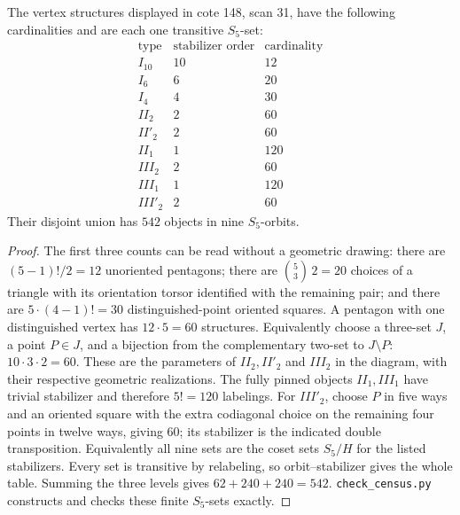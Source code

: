 The vertex structures displayed in cote 148, scan 31, have the
following cardinalities and are each one transitive $S_5$-set:
\[
\begin{array}{c|r|r}
 \text{type}&\text{stabilizer order}&\text{cardinality}\\\hline
 I_{10}&10&12\\
 I_6&6&20\\
 I_4&4&30\\
 II_2&2&60\\
 II'_2&2&60\\
 II_1&1&120\\
 III_2&2&60\\
 III_1&1&120\\
 III'_2&2&60
\end{array}
\]
Their disjoint union has $542$ objects in nine $S_5$-orbits.
\begin{proof}
The first three counts can be read without a geometric drawing:
there are $(5-1)!/2=12$ unoriented pentagons; there are
$\binom53\,2=20$ choices of a triangle with its orientation
torsor identified with the remaining pair; and there are
$5\cdot(4-1)!=30$ distinguished-point oriented squares.
A pentagon with one distinguished vertex has $12\cdot5=60$
structures.  Equivalently choose a three-set $J$, a point $P\in J$,
and a bijection from the complementary two-set to $J\setminus P$:
$10\cdot3\cdot2=60$.  These are the parameters of $II_2,II'_2$
and $III_2$ in the diagram, with their respective geometric
realizations.  The fully pinned objects $II_1,III_1$ have trivial
stabilizer and therefore $5!=120$ labelings.  For $III'_2$, choose
$P$ in five ways and an oriented square with the extra codiagonal
choice on the remaining four points in twelve ways, giving $60$;
its stabilizer is the indicated double transposition.  Equivalently
all nine sets are the coset sets $S_5/H$ for the listed stabilizers.
Every set is transitive by relabeling, so orbit--stabilizer gives
the whole table.  Summing the three levels gives
$62+240+240=542$.  \texttt{check\_census.py} constructs and
checks these finite $S_5$-sets exactly.
\end{proof}

